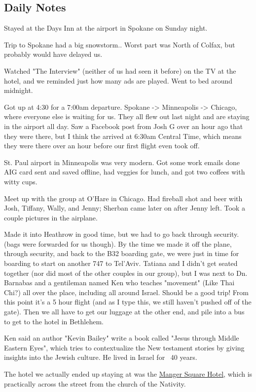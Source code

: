 \documentclass[letterpaper]{report}
\begin{document}
\clearpage
\begin{multicols}{2}
\subsection{Daily Notes}
Stayed at the Days Inn at the airport  in Spokane on Sunday night.

Trip to Spokane had a big snowstorm.. Worst part was North of Colfax, but probably would have delayed us.

Watched "The Interview" (neither of us had seen it before) on the TV at the hotel, and we reminded just how many ads are played. Went to bed around midnight.

Got up at 4:30 for a 7:00am departure. Spokane -> Minneapolis -> Chicago, where everyone else is waiting for us. They all flew out last night and are staying in the airport all day. Saw a Facebook post from Josh G over an hour ago that they were there, but I think the arrived at 6:30am Central Time, which means they were there over an hour before our first flight even took off.

St. Paul airport in Minneapolis was very modern. Got some work emails done AIG card sent and saved offline, had veggies for lunch, and got two coffees with witty cups.

Meet up with the group at O'Hare in Chicago. Had fireball shot and beer with Josh, Tiffany, Wally, and Jenny; Sherban came later on after Jenny left. Took a couple pictures in the airplane.

Made it into Heathrow in good time, but we had to go back through security.  (bags were forwarded for us though).
By the time we made it off the plane, through security, and back to the B32 boarding gate, we were just in time for boarding to start on another 747 to Tel'Aviv.  Tatiana and I didn't get seated together (nor did most of the other couples in our group), but I was next to Dn. Barnabas and a gentileman named Ken who teaches "movement" (Like Thai Chi?) all over the place, including all around Israel. Should be a good trip!   From this point it's a 5 hour flight (and as I type this, we still haven't pushed off of the gate).  Then we all have to get our luggage at the other end, and pile into a bus to get to the hotel in Bethlehem.

Ken said an author "Kevin Bailey" write a book called "Jesus through Middle Eastern Eyes", which tries to contextualize the New testament stories by giving insights into the Jewish culture. He lived in Israel for ~40 years.

The hotel we actually ended up staying at was the
\href{http://www.mangersquarehotel.com/}{
  Manger Square Hotel}, which is practically across the street from the church of the Nativity.
\end{multicols}
\end{document}
